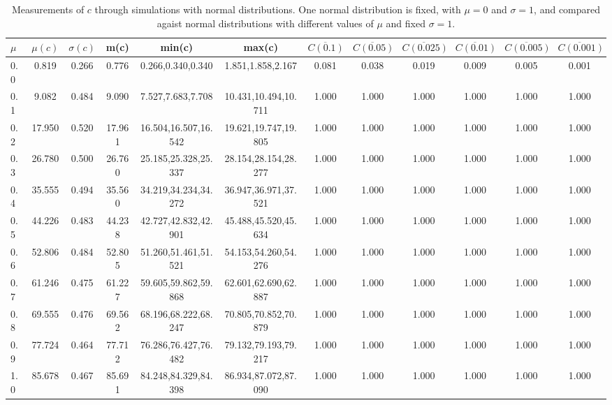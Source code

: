\begin{table*}[h!]
\begin{center}
\begin{tabular}{| l | c | c | c | c | c | c | c | c | c | c | c |}\hline
$\mu$ & $\mu(c)$ & $\sigma(c)$ & m(c) & min(c) & max(c) & $\overline{C(0.1)}$ & $\overline{C(0.05)}$ & $\overline{C(0.025)}$ & $\overline{C(0.01)}$ & $\overline{C(0.005)}$ & $\overline{C(0.001)}$ \\\hline
0.0 & 0.819 & 0.266 & 0.776 & 0.266,0.340,0.340 & 1.851,1.858,2.167  & 0.081  & 0.038  & 0.019  & 0.009  & 0.005  & 0.001 \\\hline
0.1 & 9.082 & 0.484 & 9.090 & 7.527,7.683,7.708 & 10.431,10.494,10.711  & 1.000  & 1.000  & 1.000  & 1.000  & 1.000  & 1.000 \\\hline
0.2 & 17.950 & 0.520 & 17.961 & 16.504,16.507,16.542 & 19.621,19.747,19.805  & 1.000  & 1.000  & 1.000  & 1.000  & 1.000  & 1.000 \\\hline
0.3 & 26.780 & 0.500 & 26.760 & 25.185,25.328,25.337 & 28.154,28.154,28.277  & 1.000  & 1.000  & 1.000  & 1.000  & 1.000  & 1.000 \\\hline
0.4 & 35.555 & 0.494 & 35.560 & 34.219,34.234,34.272 & 36.947,36.971,37.521  & 1.000  & 1.000  & 1.000  & 1.000  & 1.000  & 1.000 \\\hline
0.5 & 44.226 & 0.483 & 44.238 & 42.727,42.832,42.901 & 45.488,45.520,45.634  & 1.000  & 1.000  & 1.000  & 1.000  & 1.000  & 1.000 \\\hline
0.6 & 52.806 & 0.484 & 52.805 & 51.260,51.461,51.521 & 54.153,54.260,54.276  & 1.000  & 1.000  & 1.000  & 1.000  & 1.000  & 1.000 \\\hline
0.7 & 61.246 & 0.475 & 61.227 & 59.605,59.862,59.868 & 62.601,62.690,62.887  & 1.000  & 1.000  & 1.000  & 1.000  & 1.000  & 1.000 \\\hline
0.8 & 69.555 & 0.476 & 69.562 & 68.196,68.222,68.247 & 70.805,70.852,70.879  & 1.000  & 1.000  & 1.000  & 1.000  & 1.000  & 1.000 \\\hline
0.9 & 77.724 & 0.464 & 77.712 & 76.286,76.427,76.482 & 79.132,79.193,79.217  & 1.000  & 1.000  & 1.000  & 1.000  & 1.000  & 1.000 \\\hline
1.0 & 85.678 & 0.467 & 85.691 & 84.248,84.329,84.398 & 86.934,87.072,87.090  & 1.000  & 1.000  & 1.000  & 1.000  & 1.000  & 1.000 \\\hline
\end{tabular}
\caption{Measurements of $c$ through simulations
with normal distributions.
One normal distribution is fixed, with $\mu=0$ and $\sigma=1$,
and compared agaist normal distributions with different values of $\mu$ and fixed $\sigma=1$.}
\end{center}
\end{table*}